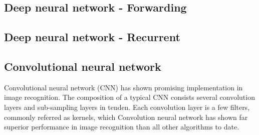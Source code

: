 \subsection{Deep neural network - Forwarding}
\subsection{Deep neural network - Recurrent}
\subsection{Convolutional neural network}
Convolutional neural network (CNN) has shown promising implementation in image recognition. The composition of a typical CNN consists several convolution layers and sub-sampling layers in tenden. Each convolution layer is a few filters, commonly referred as kernels, which  
Convolution neural network has shown far superior performance in image recognition than all other algorithms to date.~\cite{Szegedy_2015}